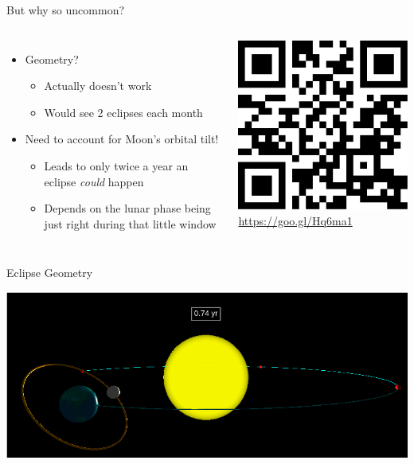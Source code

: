 \documentclass[pdf, aspectratio=169]{beamer}
\begin{document}
\begin{frame}{But why so uncommon?}
	\begin{columns}
		\begin{itemize}[<+->]
			\item Geometry?
				\begin{itemize}
					\item Actually doesn't work
					\item Would see 2 eclipses each month
				\end{itemize}
			\item Need to account for Moon's orbital tilt!
				\begin{itemize}
					\item Leads to only twice a year an eclipse \emph{could} happen
					\item Depends on the lunar phase being just right during that little window
				\end{itemize}
		\end{itemize}	
		\begin{center}
			\includegraphics[width=.7\textwidth]{saros.pdf}\\
			\url{https://goo.gl/Hq6ma1}
		\end{center}
	\end{columns}
\end{frame}

\begin{frame}{Eclipse Geometry}
	\begin{center}
		\includegraphics[width=\textwidth]{EclipseGeometry.png}
	\end{center}
\end{frame}
\end{document}
